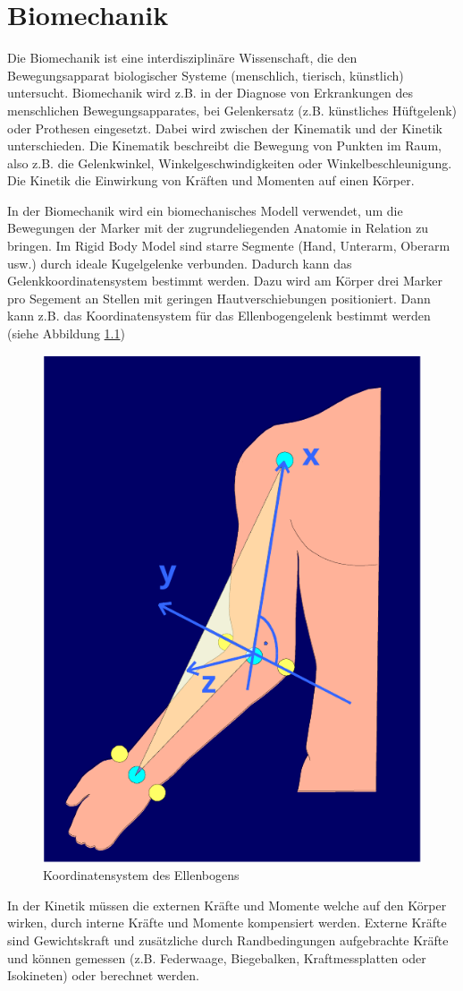 \chapter{Biomechanik}

Die Biomechanik ist eine interdisziplinäre Wissenschaft, die den Bewegungsapparat biologischer Systeme (menschlich, tierisch, künstlich) untersucht. Biomechanik wird z.B. in der Diagnose von Erkrankungen des menschlichen Bewegungsapparates, bei Gelenkersatz (z.B. künstliches Hüftgelenk) oder Prothesen eingesetzt. Dabei wird zwischen der Kinematik und der Kinetik unterschieden. Die Kinematik beschreibt die Bewegung von Punkten im Raum, also z.B. die Gelenkwinkel, Winkelgeschwindigkeiten oder Winkelbeschleunigung. Die Kinetik die Einwirkung von Kräften und Momenten auf einen Körper.

In der Biomechanik wird ein biomechanisches Modell verwendet, um die Bewegungen der Marker mit der zugrundeliegenden Anatomie in Relation zu bringen. Im Rigid Body Model sind starre Segmente (Hand, Unterarm, Oberarm usw.) durch ideale Kugelgelenke verbunden. Dadurch kann das Gelenkkoordinatensystem bestimmt werden. Dazu wird am Körper drei Marker pro Segement an Stellen mit geringen Hautverschiebungen positioniert. Dann kann z.B. das Koordinatensystem für das Ellenbogengelenk bestimmt werden (siehe Abbildung \ref{fig:ellenbogen})

\begin{figure}
\centering
\includegraphics[width=0.5\linewidth]{fig/ellenbogen}
\caption{Koordinatensystem des Ellenbogens}
\label{fig:ellenbogen}
\end{figure}

In der Kinetik müssen die externen Kräfte und Momente welche auf den Körper wirken, durch interne Kräfte und Momente kompensiert werden. Externe Kräfte sind Gewichtskraft und zusätzliche durch Randbedingungen aufgebrachte Kräfte und können gemessen (z.B. Federwaage, Biegebalken, Kraftmessplatten oder Isokineten) oder berechnet werden.